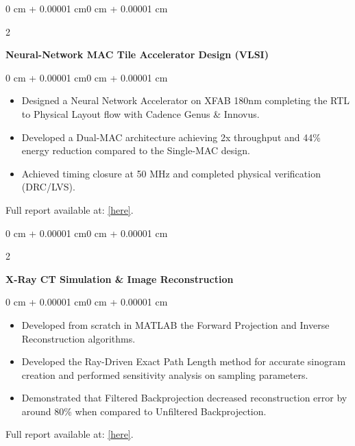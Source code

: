 \documentclass[10pt, letterpaper]{article}
\newenvironment{highlights}{
    \begin{itemize}[
        topsep=0.10 cm,
        parsep=0.10 cm,
        partopsep=0pt,
        itemsep=0pt,
        leftmargin=0 cm + 10pt
    ]
}{
    \end{itemize}
} %
\newenvironment{onecolentry}{
    \begin{adjustwidth}{0 cm + 0.00001 cm}{0 cm + 0.00001 cm}
}{
    \end{adjustwidth}
} %
\newenvironment{twocolentry}[2][]{
    \onecolentry
    \def\secondColumn{#2}
    \setcolumnwidth{\fill, 4.5 cm}
    \begin{paracol}{2}
}{
    \switchcolumn \raggedleft \secondColumn
    \end{paracol}
    \endonecolentry
} %
\begin{document}
\vspace{0.2 cm}
\begin{twocolentry}{}
    \textbf{Neural-Network MAC Tile Accelerator Design (VLSI)}
\end{twocolentry}

\vspace{0.10 cm}


\begin{onecolentry}
    \begin{highlights}
        \item Designed a Neural Network Accelerator on XFAB 180nm completing the RTL to Physical Layout flow with Cadence Genus  \&  Innovus.
        \item Developed a Dual-MAC architecture achieving 2x throughput and 44\% energy reduction compared to the Single-MAC design.
        \item Achieved timing closure at 50 MHz and completed physical verification (DRC/LVS).
        
    \end{highlights}
\end{onecolentry}
    Full report available at: \href{https://drive.google.com/file/d/1bxllJ0fdsJWdAEdpuMTNm5sW8nCLTTSL/view?usp=sharing}{[here]}.

\vspace{0.2 cm}
\begin{twocolentry}{}
    \textbf{X-Ray CT Simulation \& Image Reconstruction}
\end{twocolentry}

\vspace{0.10 cm}
\begin{onecolentry}
    \begin{highlights}
        \item Developed from scratch in MATLAB the Forward Projection and Inverse Reconstruction algorithms.
        \item Developed the Ray-Driven Exact Path Length method for accurate sinogram creation and performed sensitivity analysis on sampling parameters.
        \item Demonstrated that Filtered Backprojection decreased reconstruction error by around 80\% when compared to Unfiltered Backprojection.
    \end{highlights}
        Full report available at: \href{https://drive.google.com/file/d/1aaxeCN1S0WdStdJdRa9rEZZdUCy7QbqD/view?usp=sharing}{[here]}.
\end{onecolentry}
\end{document}
